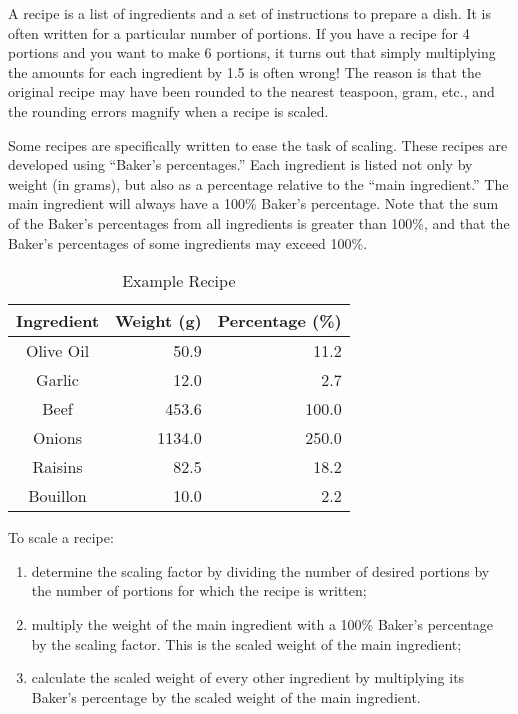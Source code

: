 
\setlength{\columnsep}{15pt}


A recipe is a list of ingredients and a set of instructions to prepare
a dish.  It is often written for a particular number of portions.  If
you have a recipe for 4 portions and you want to make 6 portions, it
turns out that simply multiplying the amounts for each ingredient by
1.5 is often wrong!  The reason is that the original recipe may have
been rounded to the nearest teaspoon, gram, etc., and the rounding
errors magnify when a recipe is scaled.

Some recipes are specifically written to ease the task of scaling.
These recipes are developed using ``Baker's percentages.''  Each
ingredient is listed not only by weight (in grams), but also as a
percentage relative to the ``main ingredient.''  The main ingredient
will always have a 100\% Baker's percentage.  Note that the sum of
the Baker's percentages from all ingredients is greater than 100\%, and
that the Baker's percentages of some ingredients may exceed 100\%.

\begin{table}[h!]
\centering
\caption{Example Recipe}
\begin{tabular}{|c|r|r|}
\multicolumn{1}{c}{Ingredient} &
\multicolumn{1}{c}{Weight (g)} &
\multicolumn{1}{c}{Percentage (\%)} \\
\hline
Olive Oil & 50.9 & 11.2 \\
Garlic & 12.0	& 2.7 \\
Beef & 453.6 &	100.0 \\
Onions & 1134.0 & 250.0 \\
Raisins & 82.5	& 18.2 \\
Bouillon & 10.0 & 2.2 \\
\hline
\end{tabular}
\end{table}

To scale a recipe:
\begin{enumerate}
\item determine the scaling factor by dividing the number of desired
  portions by the number of portions for which the recipe is written;
\item multiply the weight of the main ingredient with a 100\% Baker's
  percentage by the scaling factor.  This is the scaled weight of the
  main ingredient;
\item calculate the scaled weight of every other ingredient by
  multiplying its Baker's percentage by the scaled weight of the main
  ingredient.
\end{enumerate}

